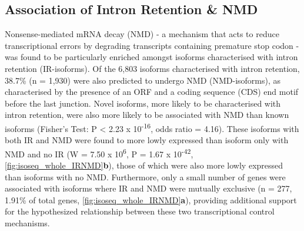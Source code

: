 \vspace{1cm}
\subsection{Association of Intron Retention \& NMD}
Nonsense-mediated mRNA decay (NMD) - a mechanism that acts to reduce transcriptional errors by degrading transcripts containing premature stop codon - was found to be particularly enriched amongst isoforms characterised with intron retention (IR-isoforms). Of the 6,803 isoforms characterised with intron retention, 38.7\% (n = 1,930) were also predicted to undergo NMD (NMD-isoforms), as characterised by the presence of an ORF and a coding sequence (CDS) end motif before the last junction. Novel isoforms, more likely to be characterised with intron retention, were also more likely to be associated with NMD than known isoforms (Fisher's Test: P < 2.23 x 10\textsuperscript{-16}, odds ratio = 4.16). These isoforms with both IR and NMD were found to more lowly expressed than isoform only with NMD and no IR (W = 7.50 x 10\textsuperscript{6}, P = 1.67 x 10\textsuperscript{-42}, \cref{fig:isoseq_whole_IRNMD}\textbf{b}), those of which were also more lowly expressed than isoforms with no NMD. Furthermore, only a small number of genes were associated with isoforms where IR and NMD were mutually exclusive (n = 277, 1.91\% of total genes, \cref{fig:isoseq_whole_IRNMD}\textbf{a}), providing additional support for the hypothesized relationship between these two transcriptional control mechanisms.

